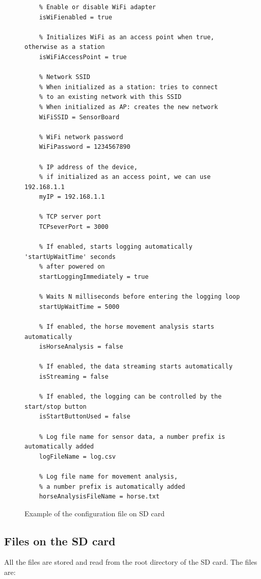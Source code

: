 \begin{figure}
	\centering
	\label{SBconfigFile}
	\caption{Example of the configuration file on SD card}
	\begin{verbatim}
	% Enable or disable WiFi adapter
	isWiFienabled = true
	
	% Initializes WiFi as an access point when true, otherwise as a station
	isWiFiAccessPoint = true
	
	% Network SSID
	% When initialized as a station: tries to connect
	% to an existing network with this SSID
	% When initialized as AP: creates the new network
	WiFiSSID = SensorBoard
	
	% WiFi network password
	WiFiPassword = 1234567890
	
	% IP address of the device,
	% if initialized as an access point, we can use 192.168.1.1
	myIP = 192.168.1.1
	
	% TCP server port
	TCPseverPort = 3000
	
	% If enabled, starts logging automatically 'startUpWaitTime' seconds
	% after powered on
	startLoggingImmediately = true
	
	% Waits N milliseconds before entering the logging loop
	startUpWaitTime = 5000
	
	% If enabled, the horse movement analysis starts automatically
	isHorseAnalysis = false
	
	% If enabled, the data streaming starts automatically
	isStreaming = false
	
	% If enabled, the logging can be controlled by the start/stop button
	isStartButtonUsed = false
	
	% Log file name for sensor data, a number prefix is automatically added
	logFileName = log.csv
	
	% Log file name for movement analysis,
	% a number prefix is automatically added
	horseAnalysisFileName = horse.txt
	\end{verbatim}
\end{figure}

\subsection{Files on the SD card}
All the files are stored and read from the root directory of the SD card. The files are:

